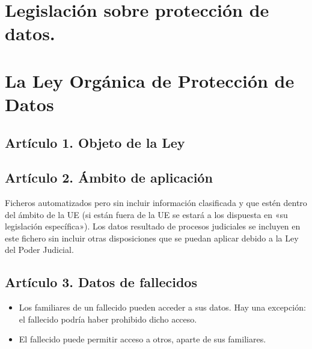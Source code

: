 \documentclass[letterpaper,10pt,spanish]{sphinxmanual}
\begin{document}
\section{Legislación sobre protección de datos.}
\label{\detokenize{tema_lopd/tema_lopd:legislacion-sobre-proteccion-de-datos}}

\section{La Ley Orgánica de Protección de Datos}
\label{\detokenize{tema_lopd/tema_lopd:la-ley-organica-de-proteccion-de-datos}}

\subsection{Artículo 1. Objeto de la Ley}
\label{\detokenize{tema_lopd/tema_lopd:articulo-1-objeto-de-la-ley}}

\subsection{Artículo 2. Ámbito de aplicación}
\label{\detokenize{tema_lopd/tema_lopd:articulo-2-ambito-de-aplicacion}}
Ficheros automatizados pero sin incluir información clasificada y que estén dentro del ámbito de la UE (si están fuera de la UE se estará a los dispuesta en «su legislación específica»). Los datos resultado de procesos judiciales se incluyen en este fichero sin incluir otras disposiciones que se puedan aplicar debido a la Ley del Poder Judicial.


\subsection{Artículo 3. Datos de fallecidos}
\label{\detokenize{tema_lopd/tema_lopd:articulo-3-datos-de-fallecidos}}\begin{itemize}
\item {} 
Los familiares de un fallecido pueden acceder a sus datos. Hay una excepción: el fallecido podría haber prohibido dicho acceso.

\item {} 
El fallecido puede permitir acceso a otros, aparte de sus familiares.

\end{itemize}
\end{document}
